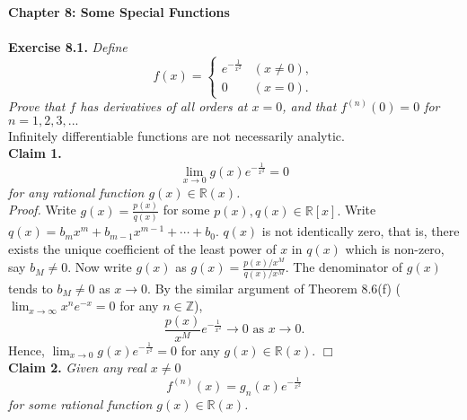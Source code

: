 \documentclass{article}
\begin{document}
\textbf{\Large Chapter 8: Some Special Functions} \\\\






\textbf{Exercise 8.1.}
\emph{Define
\begin{equation*}
  f(x) =
    \begin{cases}
      e^{-\frac{1}{x^2}} & (x \neq 0), \\
      0                  & (x = 0).
    \end{cases}
\end{equation*}
Prove that $f$ has derivatives of all orders at $x = 0$,
and that $f^{(n)}(0) = 0$ for $n = 1, 2, 3, ...$} \\

Infinitely differentiable functions are not necessarily
analytic. \\

\textbf{Claim 1.}
\emph{$$\lim_{x \rightarrow 0} g(x) e^{-\frac{1}{x^2}} = 0$$
for any rational function $g(x) \in \mathbb{R}(x)$.} \\

\emph{Proof.}
Write $g(x) = \frac{p(x)}{q(x)}$ for some $p(x), q(x) \in \mathbb{R}[x].$
Write $q(x) = b_m x^m + b_{m - 1} x^{m - 1} + \cdots + b_0$.
$q(x)$ is not identically zero, that is, there exists the unique coefficient
of the least power of $x$ in $q(x)$ which is non-zero, say $b_M \neq 0$.
Now write $g(x)$ as $g(x) = \frac{p(x)/x^M}{q(x)/x^M}$.
The denominator of $g(x)$ tends to $b_M \neq 0$ as $x \rightarrow 0$.
By the similar argument of Theorem 8.6(f)
($\lim_{x \rightarrow \infty} x^n e^{-x} = 0$ for any $n \in \mathbb{Z}$),
$$\frac{p(x)}{x^M} e^{-\frac{1}{x^2}} \rightarrow 0 \text{ as } x \rightarrow 0.$$
Hence, $\lim_{x \rightarrow 0} g(x) e^{-\frac{1}{x^2}} = 0$
for any $g(x) \in \mathbb{R}(x)$.
$\Box$ \\

\textbf{Claim 2.}
\emph{Given any real $x \neq 0$
$$f^{(n)}(x) = g_n(x) e^{-\frac{1}{x^2}}$$
for some rational function $g(x) \in \mathbb{R}(x)$.} \\
\end{document}
